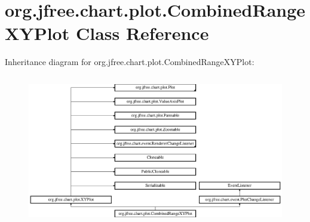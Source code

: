 \hypertarget{classorg_1_1jfree_1_1chart_1_1plot_1_1_combined_range_x_y_plot}{}\section{org.\+jfree.\+chart.\+plot.\+Combined\+Range\+X\+Y\+Plot Class Reference}
\label{classorg_1_1jfree_1_1chart_1_1plot_1_1_combined_range_x_y_plot}
Inheritance diagram for org.\+jfree.\+chart.\+plot.\+Combined\+Range\+X\+Y\+Plot\+:\begin{figure}[H]
\begin{center}
\leavevmode
\includegraphics[height=6.595995cm]{classorg_1_1jfree_1_1chart_1_1plot_1_1_combined_range_x_y_plot}
\end{center}
\end{figure}
